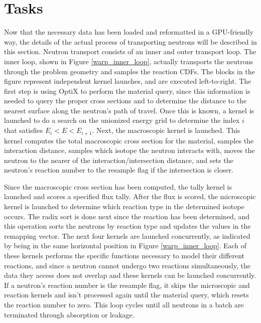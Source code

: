 
\section{Tasks}
\label{sec:tasks}

Now that the necessary data has been loaded and reformatted in a GPU-friendly way, the details of the actual process of transporting neutrons will be described in this section.  Neutron transport consists of an inner and outer transport loop.  The inner loop, shown in Figure \ref{warp_inner_loop}, actually transports the neutrons through the problem geometry and samples the reaction CDFs.  The blocks in the figure represent independent kernel launches, and are executed left-to-right.  The first step is using OptiX to perform the material query, since this information is needed to query the proper cross sections and to determine the distance to the nearest surface along the neutron's path of travel.  Once this is known, a kernel is launched to do a search on the unionized energy grid to determine the index $i$ that satisfies $E_i<E<E_{i+1}$.  Next, the macroscopic kernel is launched. This kernel computes the total macroscopic cross section for the material, samples the interaction distance, samples which isotope the neutron interacts with, moves the neutron to the nearer of the interaction/intersection distance, and sets the neutron's reaction number to the resample flag if the intersection is closer.  

Since the macroscopic cross section has been computed, the tally kernel is launched and scores a specified flux tally.  After the flux is scored, the microscopic kernel is launched to determine which reaction type in the determined isotope occurs.  The radix sort is done next since the reaction has been determined, and this operation sorts the neutrons by reaction type and updates the values in the remapping vector.  The next four kernels are launched concurrently, as indicated by being in the same horizontal position in Figure \ref{warp_inner_loop}.  Each of these kernels performs the specific functions necessary to model their different reactions, and since a neutron cannot undergo two reactions simultaneously, the data they access does not overlap and these kernels can be launched concurrently.  If a neutron's reaction number is the resample flag, it skips the microscopic and reaction kernels and isn't processed again until the material query, which resets the reaction number to zero.   This loop cycles until all neutrons in a batch are terminated through absorption or leakage.  

